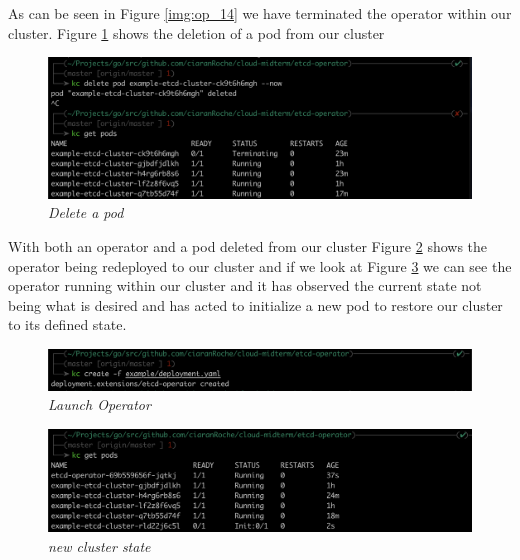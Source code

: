 As can be seen in Figure \ref{img:op_14} we have terminated the operator within our cluster. Figure \ref{img:op_15} shows the deletion of a pod from our cluster
\begin{figure}[!ht]
\centering
\includegraphics*[width=1\textwidth]{images/op915.png}
\caption{\em Delete a pod}
\label{img:op_15}
\end{figure}

With both an operator and a pod deleted from our cluster Figure \ref{img:op_16} shows the operator being redeployed to our cluster and if we look at Figure \ref{img:op_17} we can see the operator running within our cluster and it has observed the current state not being what is desired and has acted to initialize a new pod to restore our cluster to its defined state.
\begin{figure}[!ht]
\centering
\includegraphics*[width=1\textwidth]{images/op916.png}
\caption{\em Launch Operator}
\label{img:op_16}
\end{figure}

\begin{figure}[!ht]
\centering
\includegraphics*[width=1\textwidth]{images/op917.png}
\caption{\em new cluster state}
\label{img:op_17}
\end{figure}
\newpage
